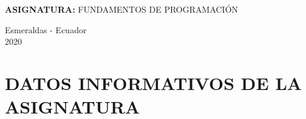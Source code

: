 \documentclass[a4paper,12pt,spanish]{article}
\begin{document}
\begin{titlepage}
{{\begin{minipage}[H]{0.3\linewidth}
\begin{center}
   { \large \textbf{ASIGNATURA:} FUNDAMENTOS DE PROGRAMACIÓN \par}

   \vspace{7.5cm}
  \end{center}
 
  
  \begin{center}
  {\large Esmeraldas - Ecuador \\ 2020\par}
\end{center}
\vspace{1.8cm}
\end{minipage}
}
}




\end{titlepage}

  
\tableofcontents

\section{DATOS INFORMATIVOS DE LA ASIGNATURA}
\end{document}
